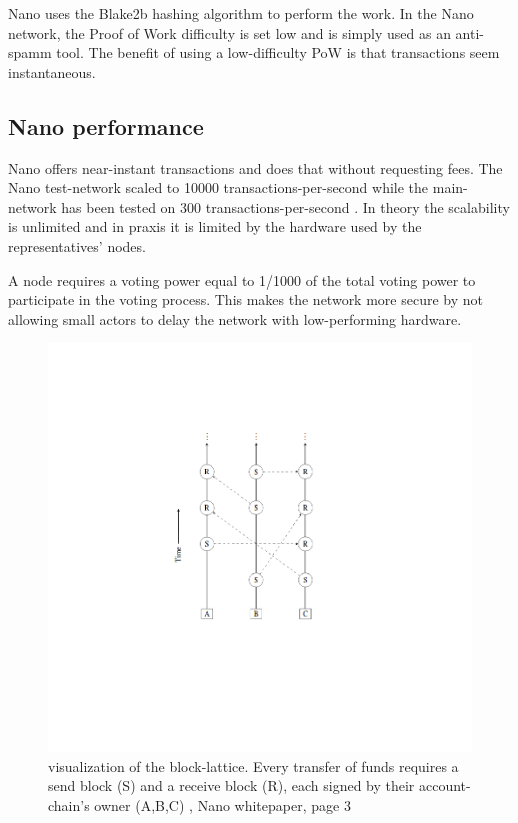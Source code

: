 \documentclass{ferseminar}
\begin{document}
Nano uses the Blake2b hashing algorithm to perform the work. In the Nano network, the Proof of Work difficulty is set low and is simply used as an anti-spamm tool. The benefit of using a low-difficulty PoW is that transactions seem instantaneous.


\subsection{Nano performance}
Nano offers near-instant transactions and does that without requesting fees. The Nano test-network scaled to 10000 transactions-per-second while the main-network has been tested on 300 transactions-per-second \cite{Stress}. In theory the scalability is unlimited and in praxis it is limited by the hardware used by the representatives' nodes.

A node requires a voting power equal to 1/1000 of the total voting power to participate in the voting process. This makes the network more secure by not allowing small actors to delay the network with low-performing hardware.


\begin{figure}[ht]
	\caption{visualization of the block-lattice. 
		Every transfer of funds requires a
		send block (S) and a receive block (R), each signed by their account-chain’s
		owner (A,B,C) \cite{Nano}, Nano whitepaper, page 3}
	\includegraphics[scale=0.6]{lattice}
	\centering
\end{figure}
\FloatBarrier
\end{document}

